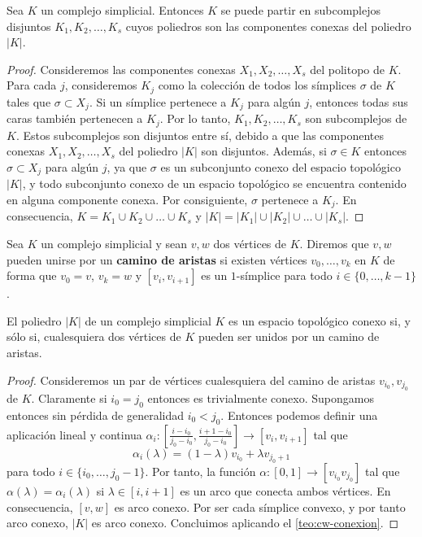\begin{proposicion}
	Sea \( K \) un complejo simplicial. Entonces \( K \) se puede partir en subcomplejos disjuntos \( K_1, K_2, \ldots, K_s \) cuyos poliedros son las componentes conexas del poliedro \( |K| \).
\end{proposicion}
\begin{proof}
	Consideremos las componentes conexas \( X_1, X_2, \ldots, X_s \) del politopo de \( K \). Para cada \( j \), consideremos \( K_j \) como la colección de todos los símplices \( \sigma \) de \( K \) tales que \( \sigma \subset X_j \). Si un símplice pertenece a \( K_j \) para algún \( j \), entonces todas sus caras también pertenecen a \( K_j \). Por lo tanto, \( K_1, K_2, \ldots, K_s \) son subcomplejos de \( K \). Estos subcomplejos son disjuntos entre sí, debido a que las componentes conexas \( X_1, X_2, \ldots, X_s \) del poliedro \( |K| \) son disjuntos. Además, si \( \sigma \in K \) entonces \( \sigma \subset X_j \) para algún \( j \), ya que \( \sigma \) es un subconjunto conexo del espacio topológico \( |K| \), y todo subconjunto conexo de un espacio topológico se encuentra contenido en alguna componente conexa. Por consiguiente, \( \sigma \) pertenece a \( K_j \). En consecuencia, \( K = K_1 \cup K_2 \cup \ldots \cup K_s \) y \( |K| = |K_1| \cup |K_2| \cup \ldots \cup |K_s| \).
\end{proof}

\begin{definicion}
	Sea \(K\) un complejo simplicial y sean \(v,w\) dos vértices de \(K\). Diremos que \(v,w\) pueden unirse por un \textbf{camino de aristas} si existen vértices \(v_0, \ldots, v_k\) en \(K\) de forma que \(v_0 = v\), \(v_k = w\) y \([v_i, v_{i+1}]\) es un \(1\)-símplice para todo \(i \in \{0, \ldots, k-1\}\).
\end{definicion}

\begin{lema}
	\label{lem:edge-path-conexion}
	El poliedro \(|K|\) de un complejo simplicial \(K\) es un espacio topológico conexo si, y sólo si, cualesquiera dos vértices de \(K\) pueden ser unidos por un camino de aristas.
\end{lema}
\begin{proof}
	Consideremos un par de vértices cualesquiera del camino de aristas \(v_{i_0}, v_{j_0}\) de \(K\). Claramente si \(i_0 = j_0\) entonces es trivialmente conexo. Supongamos entonces sin pérdida de generalidad \(i_0 < j_0\). Entonces podemos definir una aplicación lineal y continua \(\alpha_i : \left[\frac{i-i_0}{j_0-i_0}, \frac{i+1-i_0}{j_0-i_0}\right] \to [v_i, v_{i+1}]\) tal que 
	\[
	\alpha_i(\lambda) = (1-\lambda)v_{i_0} + \lambda v_{j_0+1}
	\]
	 para todo \(i \in \{ i_0, \ldots, j_0-1\}\). Por tanto, la función \(\alpha : [0,1] \to [v_{i_0} v_{j_0}]\) tal que \(\alpha(\lambda) = \alpha_i(\lambda)\) si \(\lambda \in [i, i+1]\) es un arco que conecta ambos vértices. En consecuencia, \([v,w]\) es arco conexo. Por ser cada símplice convexo, y por tanto arco conexo, \(|K|\) es arco conexo. Concluimos aplicando el \autoref{teo:cw-conexion}.
\end{proof}

